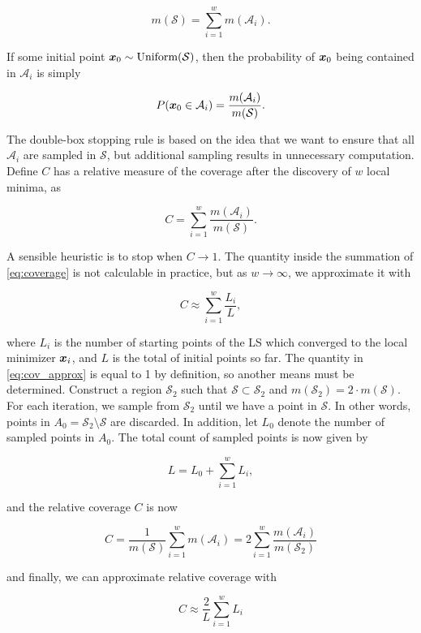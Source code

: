 $$
m(\mathcal{S}) = \sum_{i=1}^w m(\mathcal{A}_i).
$$

If some initial point $\boldsymbol{x}_0 \sim \text{Uniform}(\mathcal{S})$, then the probability of $\boldsymbol{x}_0$ being contained
in $\mathcal{A}_i$ is simply

$$
P(\boldsymbol{x}_0 \in \mathcal{A}_i) = \frac{m(\mathcal{A}_i)}{m(\mathcal{S})}.
$$

The double-box stopping rule is based on the idea that we want to ensure that all $\mathcal{A}_i$ are sampled in $\mathcal{S}$, but
additional sampling results in unnecessary computation. Define $C$ has a relative measure of the coverage after the discovery
of $w$ local minima, as

\begin{equation}\label{eq:coverage}
C = \sum_{i=1}^w \frac{m(\mathcal{A}_i)}{m(\mathcal{S})}.
\end{equation}

A sensible heuristic is to stop when $C\longrightarrow 1$. The quantity inside the summation of \cref{eq:coverage} is
not calculable in practice, but as $w\rightarrow \infty$, we approximate it with

\begin{equation}\label{eq:cov_approx}
C \approx \sum_{i=1}^w \frac{L_i}{L},
\end{equation}

where $L_i$ is the number of starting points of the LS which converged to the local minimizer $\boldsymbol{x}_i$, and
$L$ is the total of initial points so far. The quantity in \cref{eq:cov_approx} is equal to 1 by definition, so another
means must be determined. Construct a region $\mathcal{S}_2$ such that $\mathcal{S}\subset \mathcal{S}_2$ and 
$m(\mathcal{S}_2) = 2\cdot m(\mathcal{S})$. For each iteration, we sample from $\mathcal{S}_2$ until we have a point in
$\mathcal{S}$. In other words, points in $A_0 = \mathcal{S}_2 \setminus \mathcal{S}$ are discarded. In addition, let
$L_0$ denote the number of sampled points in $A_0$. The total count of sampled points is now given by

$$
L = L_0 + \sum_{i=1}^w L_i,
$$

and the relative coverage $C$ is now

$$
C = \frac{1}{m(\mathcal{S})} \sum_{i=1}^w m(\mathcal{A}_i) = 2\sum_{i=1}^w \frac{m(\mathcal{A}_i)}{m(\mathcal{S}_2)}
$$

and finally, we can approximate relative coverage with

$$
C \approx \frac{2}{L}\sum_{i=1}^w L_i
$$

